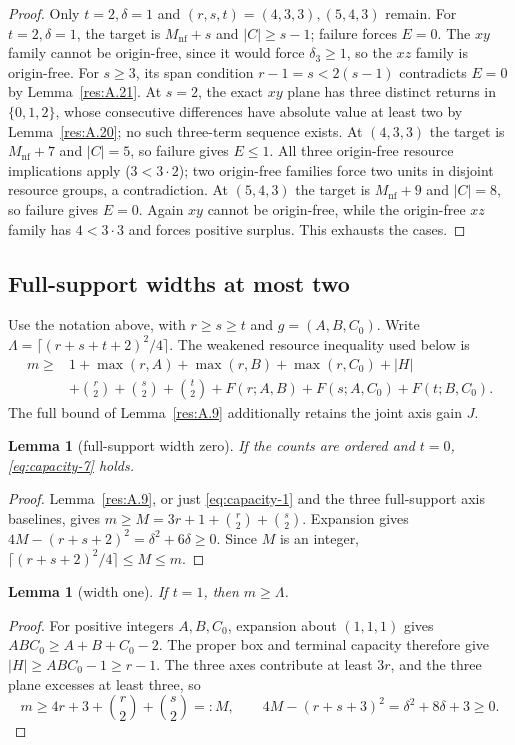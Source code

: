\documentclass[11pt]{article}
\newtheorem{lemma}[theorem]{Lemma}
\theoremstyle{definition}
\theoremstyle{remark}
\theoremstyle{plain}
\begin{document}
\begin{proof}
Only $t=2,\delta=1$ and $(r,s,t)=(4,3,3),(5,4,3)$ remain.
For $t=2,\delta=1$, the target is $M_{\mathrm{nf}}+s$ and $|C|\ge s-1$;
failure forces $E=0$.  The $xy$ family cannot be origin-free,
since it would force $\delta_3\ge1$, so the $xz$ family is origin-free.
For $s\ge3$, its span condition $r-1=s<2(s-1)$ contradicts $E=0$
by Lemma~\ref{res:A.21}.  At $s=2$, the exact $xy$ plane has three distinct
returns in $\{0,1,2\}$, whose consecutive differences have absolute
value at least two by Lemma~\ref{res:A.20}; no such three-term sequence exists.
At $(4,3,3)$ the target is $M_{\mathrm{nf}}+7$ and $|C|=5$, so failure gives
$E\le1$.  All three origin-free resource implications apply
($3<3\cdot2$); two origin-free families force two units in disjoint
resource groups, a contradiction.
At $(5,4,3)$ the target is $M_{\mathrm{nf}}+9$ and $|C|=8$, so failure gives $E=0$.
Again $xy$ cannot be origin-free, while the origin-free $xz$ family
has $4<3\cdot3$ and forces positive surplus.
This exhausts the cases. \end{proof}

\subsection{Full-support widths at most two}

Use the notation above, with $r\ge s\ge t$ and
$g=(A,B,C_0)$. Write $\Lambda=\lceil(r+s+t+2)^2/4\rceil$. The weakened resource inequality used below is
\[
\begin{split}
 m\ge{}&1+\max(r,A)+\max(r,B)+\max(r,C_0)+|H|\\
 &+\binom r2+\binom s2+\binom t2
   +F(r;A,B)+F(s;A,C_0)+F(t;B,C_0).
\end{split}\tag{3.10}\label{eq:capacity-10}
\]
The full bound of Lemma~\ref{res:A.9} additionally retains the joint axis gain $J$.

\begin{lemma}[full-support width zero]\label{res:A.19} If the counts are ordered and \(t=0\), \eqref{eq:capacity-7} holds.
\end{lemma}
\begin{proof} Lemma~\ref{res:A.9}, or just \eqref{eq:capacity-1} and the three full-support axis baselines, gives \(m\ge M=3r+1+\binom r2+\binom s2\). Expansion gives \(4M-(r+s+2)^2=\delta^2+6\delta\ge0\). Since \(M\) is an integer, \(\lceil(r+s+2)^2/4\rceil\le M\le m\). \end{proof}


\begin{lemma}[width one]\label{res:A12.1}
If $t=1$, then $m\ge \Lambda$.
\end{lemma}
\begin{proof}
For positive integers $A,B,C_0$, expansion about $(1,1,1)$ gives
$ABC_0\ge A+B+C_0-2$.  The proper box and terminal capacity therefore
give $|H|\ge ABC_0-1\ge r-1$.  The three axes contribute at least
$3r$, and the three plane excesses at least three, so
\[
 m\ge4r+3+\binom r2+\binom s2=:M,\qquad
 4M-(r+s+3)^2=\delta^2+8\delta+3\ge0.
\]
\end{proof}
\end{document}
